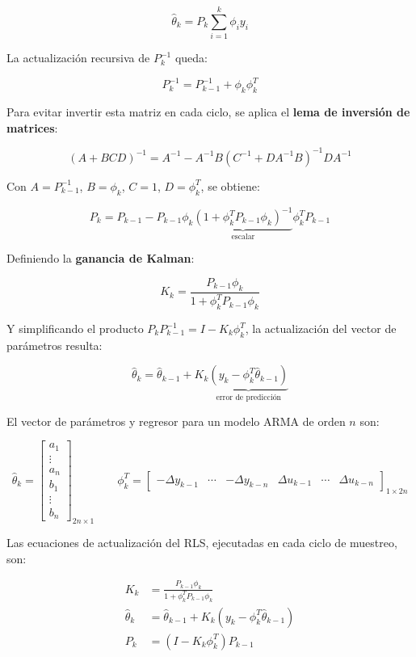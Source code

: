 \[
  \hat{\theta}_k = P_k \sum_{i=1}^k \phi_i y_i
\]

La actualización recursiva de $P_k^{-1}$ queda:

\[
  P_k^{-1} = P_{k-1}^{-1} + \phi_k\phi_k^T
\]

Para evitar invertir esta matriz en cada ciclo, se aplica el \textbf{lema de inversión de matrices}:

\begin{equation}
  (A + BCD)^{-1} = A^{-1} - A^{-1}B(C^{-1} + DA^{-1}B)^{-1}DA^{-1}
\end{equation}

Con $A = P_{k-1}^{-1}$, $B = \phi_k$, $C = 1$, $D = \phi_k^T$, se obtiene:

\[
  P_k = P_{k-1} - P_{k-1}\phi_k\underbrace{(1 + \phi_k^T P_{k-1}\phi_k)^{-1}}_{\text{escalar}}\phi_k^T P_{k-1}
\]

Definiendo la \textbf{ganancia de Kalman}:

\[
  K_k = \frac{P_{k-1}\phi_k}{1 + \phi_k^T P_{k-1}\phi_k}
\]

Y simplificando el producto $P_k P_{k-1}^{-1} = I - K_k\phi_k^T$, la actualización del vector de parámetros resulta:

\begin{equation}
  \hat{\theta}_k = \hat{\theta}_{k-1} + K_k\underbrace{(y_k - \phi_k^T\hat{\theta}_{k-1})}_{\text{error de predicción}}
  \label{eq:RLS}
\end{equation}

El vector de parámetros y regresor para un modelo ARMA de orden $n$ son:

\[
  \hat{\theta}_k = \begin{bmatrix} a_1 \\ \vdots \\ a_n \\ b_1 \\ \vdots \\ b_n \end{bmatrix}_{2n\times1}
  \qquad
  \phi_k^T = \begin{bmatrix} -\Delta y_{k-1} & \cdots & -\Delta y_{k-n} & \Delta u_{k-1} & \cdots & \Delta u_{k-n} \end{bmatrix}_{1\times2n}
\]

Las ecuaciones de actualización del RLS, ejecutadas en cada ciclo de muestreo, son:

\begin{align}
  K_k &= \frac{P_{k-1}\phi_k}{1 + \phi_k^T P_{k-1} \phi_k} \\
  \hat{\theta}_k &= \hat{\theta}_{k-1} + K_k(y_k - \phi_k^T\hat{\theta}_{k-1}) \\
  P_k &= (I - K_k\phi_k^T)P_{k-1}
\end{align}


